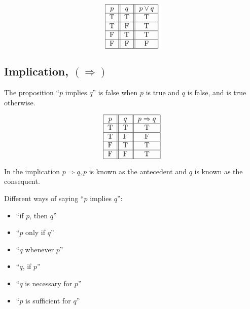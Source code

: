 \documentclass[12pt,a4paper]{article}
\begin{document}
    \begin{align*}
        \begin{tabular}{|c||c||c|}
            \hline \(p\) & \(q\) & \(p \vee q\) \\
            \hline T & T & T \\
            \hline T & F & T \\
            \hline F & T & T \\
            \hline F & F & F \\
            \hline
            \end{tabular} 
   \end{align*}
   
    \subsection{Implication, \((\Rightarrow)\)} 
   The proposition ``\(p\) implies \(q\)'' is false when \(p\) is true and \(q\) is false, and is true otherwise.

 \begin{align*}
    \begin{tabular}{|c||c||c|}
        \hline \(p\) & \(q\) & \(p \Rightarrow q\) \\
        \hline T & T & T \\
        \hline T & F & F \\
        \hline F & T & T \\
        \hline F & F & T \\
        \hline
        \end{tabular}  
\end{align*}


In the implication \(p \Rightarrow q, p\) is known as the antecedent and \(q\) is known as the consequent.

\begin{tcolorbox}
    Different ways of saying ``\(p\) implies \(q\)'':
\begin{itemize}
    \item  ``if \(p\), then \(q\)''
    \item ``\(p\) only if \(q\)''
    \item ``\(q\) whenever \(p\)''
    \item ``\(q\), if \(p\)''
    \item ``\(q\) is necessary for \(p\)''
    \item ``\(p\)   is sufficient for \(q\)''
\end{itemize}
\end{tcolorbox}
\end{document}
